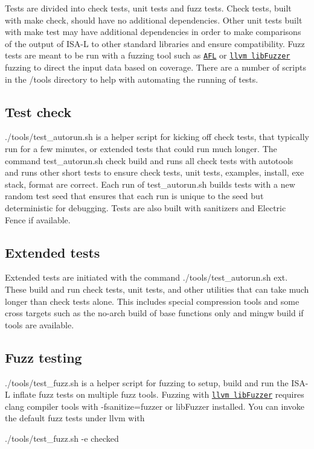 Tests are divided into check tests, unit tests and fuzz tests. Check tests, built with {\ttfamily make check}, should have no additional dependencies. Other unit tests built with {\ttfamily make test} may have additional dependencies in order to make comparisons of the output of I\-S\-A-\/\-L to other standard libraries and ensure compatibility. Fuzz tests are meant to be run with a fuzzing tool such as \href{https://github.com/google/AFL}{\tt A\-F\-L} or \href{https://llvm.org/docs/LibFuzzer.html}{\tt llvm lib\-Fuzzer} fuzzing to direct the input data based on coverage. There are a number of scripts in the /tools directory to help with automating the running of tests.

\subsection*{Test check}

{\ttfamily ./tools/test\-\_\-autorun.sh} is a helper script for kicking off check tests, that typically run for a few minutes, or extended tests that could run much longer. The command {\ttfamily test\-\_\-autorun.\-sh check} build and runs all check tests with autotools and runs other short tests to ensure check tests, unit tests, examples, install, exe stack, format are correct. Each run of {\ttfamily test\-\_\-autorun.\-sh} builds tests with a new random test seed that ensures that each run is unique to the seed but deterministic for debugging. Tests are also built with sanitizers and Electric Fence if available.

\subsection*{Extended tests}

Extended tests are initiated with the command {\ttfamily ./tools/test\-\_\-autorun.sh ext}. These build and run check tests, unit tests, and other utilities that can take much longer than check tests alone. This includes special compression tools and some cross targets such as the no-\/arch build of base functions only and mingw build if tools are available.

\subsection*{Fuzz testing}

{\ttfamily ./tools/test\-\_\-fuzz.sh} is a helper script for fuzzing to setup, build and run the I\-S\-A-\/\-L inflate fuzz tests on multiple fuzz tools. Fuzzing with \href{https://llvm.org/docs/LibFuzzer.html}{\tt llvm lib\-Fuzzer} requires clang compiler tools with {\ttfamily -\/fsanitize=fuzzer} or {\ttfamily lib\-Fuzzer} installed. You can invoke the default fuzz tests under llvm with \begin{DoxyVerb}./tools/test_fuzz.sh -e checked
\end{DoxyVerb}


